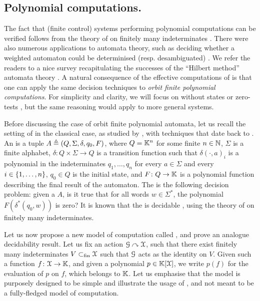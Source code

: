 %
\subsection{Polynomial computations.} \AP The fact that (finite control) systems
performing polynomial computations can be verified follows from the theory of
 on finitely many indeterminates \cite{MULSEI02,BEDUSHWO17}.
There were also numerous applications to automata theory, such as deciding
whether a weighted automaton could be determinised (resp. desambiguated)
\cite{BESM23,PUSM24}. We refer the readers to a nice survey recapitulating the
successes of the ``Hilbert method'' automata theory \cite{BOJAN19}. A natural
consequence of the effective computations of  is
that one can apply the same decision techniques to \emph{orbit finite
polynomial computations}. For simplicity and clarity, we will focus on
 without states or zero-tests \cite{BEDUSHWO17}, but
the same reasoning would apply to more general systems.


\AP Before discussing the case of orbit finite polynomial automata, let us
recall the setting of  in the classical case, as
studied by \cite{BEDUSHWO17}, with techniques that date back to
\cite{MULSEI02}. An  is a tuple $A \triangleq (Q,
\Sigma, \delta, q_0, F)$, where $Q = \mathbb{K}^n$ for some finite $n \in \mathbb{N}$, $\Sigma$
is a finite alphabet, $\delta \colon Q \times \Sigma \to Q$ is a transition
function such that $\delta(\cdot,a)_i$ is a polynomial in the indeterminates
$q_1, \dots, q_n$ for every $a \in \Sigma$ and every $i \in \{ 1, \dots, n \}$,
$q_0 \in Q$ is the initial state, and $F \colon Q \to \mathbb{K}$ is a polynomial
function describing the final result of the automaton. The  is the following decision problem: given a
 $A$, is it true that for all words $w \in \Sigma^*$,
the polynomial $F(\delta^*(q_0, w))$ is zero? It is known that the  is decidable \cite{BEDUSHWO17}, using the
theory of  on finitely many indeterminates. 


\newcommand{\toequiv}{\stackrel{\text{\tiny{eq}}}{\to}}

\AP Let us now propose a new model of computation called , and prove an analogue decidability result. Let us fix an
 action $\mathcal{G} \curvearrowright \mathcal{X}$, such that there
exist finitely many indeterminates $V \subset_{\text{fin}} \mathcal{X}$ such that $\mathcal{G}$ acts
as the identity on $V$. Given such a function $f \colon \mathcal{X} \to \mathbb{K}$, and
given a polynomial $p \in \mathbb{K}[\mathcal{X}]$, we write $p(f)$ for the
evaluation of $p$ on $f$, which belongs to $\mathbb{K}$. Let us emphasise that the model
is purposely designed to be simple and illustrate the usage of , and not meant to be a fully-fledged model of computation.

